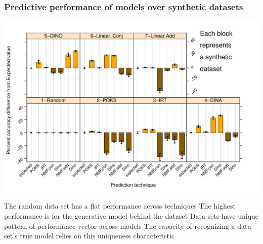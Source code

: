 \documentclass{beamer}
\begin{document}
\begin{frame}\frametitle{Predictive performance of models over synthetic datasets}
\vspace{-0.5cm}
\includegraphics[scale =0.45] {images/Syn}
\begin{overprint}
      The random data set has a flat performance across techniques 
       \small The highest performance is for the generative model behind the dataset
	  \onslide<3> \small Data sets have unique pattern of performance vector across models
	  \onslide<4> The capacity of recognizing a data set’s true model relies on this uniqueness characteristic
\end{overprint}
\end{frame}
\end{document}
